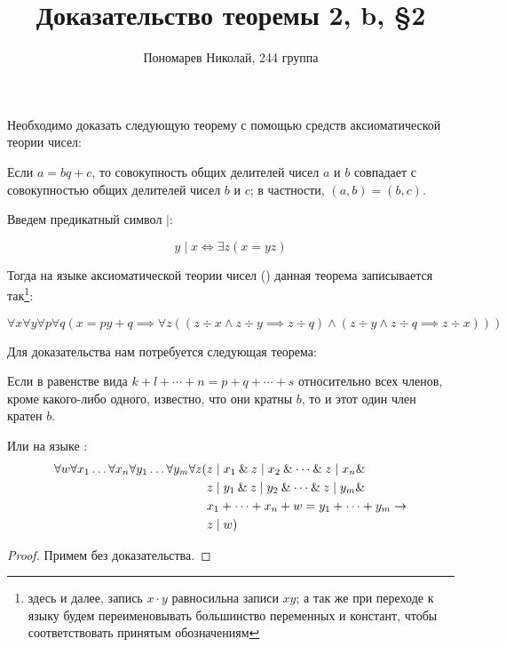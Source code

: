 \documentclass[10pt, a4paper, oneside]{memoir}
\title{Доказательство теоремы \textbf{2, b, \S 2}}
\author{Пономарев Николай, 244 группа}
\date{}
\begin{document}
\maketitle
Необходимо доказать следующую теорему с помощью средств аксиоматической теории чисел:
\begin{theorem*}
    Если $a = bq + c$, то совокупность общих делителей чисел $a$ и $b$ совпадает с совокупностью общих делителей чисел $b$ и $c$; в частности, $(a, b) = (b, c)$.
\end{theorem*}

Введем предикатный символ $\mid$:
\begin{definition}[делимость]
    \begin{equation}
        y \mid x \Leftrightarrow \exists z (x = yz)
    \end{equation}
\end{definition}

Тогда на языке аксиоматической теории чисел (\FA) данная теорема записывается так\footnote{здесь и далее, запись $x \cdot y$ равносильна записи $xy$; а так же при переходе к языку \FA{} будем переименовывать большинство переменных и констант, чтобы соответствовать принятым обозначениям}:
\begin{theorem*}
    \begin{equation} \label{thm}
        \forall x \forall y \forall p \forall q (x = py + q \implies \forall z ((z \div x \land z \div y \implies z \div q) \land (z \div y \land z \div q \implies z \div x)))
    \end{equation}
\end{theorem*}

Для доказательства нам потребуется следующая теорема:
\begin{theorem}[\textbf{2, b, \S 1}] \label{auxthm}
    Если в равенстве вида $k + l + \dotsb + n = p + q + \dotsb + s$ относительно всех членов, кроме какого-либо одного, известно, что они кратны $b$, то и этот один член кратен $b$.

    Или на языке \FA:
    \begin{align}
        \forall w \forall x_1 \dots \forall x_n \forall y_1 \dots \forall y_m \forall z ( & z \mid x_1 \land z \mid x_2 \land \dotsb \land z \mid x_n \land \notag \\
                                                                                          & z \mid y_1 \land z \mid y_2 \land \dotsb \land z \mid y_m \land \notag \\
                                                                                          & x_1 + \dotsb + x_n + w = y_1 + \dotsb + y_m \rightarrow \notag         \\
                                                                                          & z \mid w)
    \end{align}
\end{theorem}
\begin{proof}
    Примем без доказательства.
\end{proof}
\end{document}
